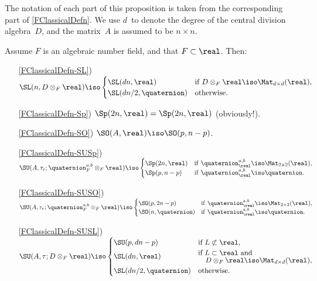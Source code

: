 \begin{prop} \label{GFxR}
 The notation of each part of this
proposition is taken from the corresponding part of
\cref{FClassicalDefn}. We use $d$~to denote the
degree of the central division algebra~$D$, and the matrix~$A$ is assumed to be $n \times n$.

 Assume $F$ is an algebraic number field, and that $F \subset \real$. Then:

 \begin{enumerate} \itemsep=\medskipamount
 
 \item[\ref{FClassicalDefn-SL})]
 $\SL(n,D \otimes_F \real) \iso
 \begin{cases}
 \SL(dn,\real) & \text{if $D  \otimes_F \real \iso \Mat_{d \times d}(\real)$}, \\
 \SL(dn/2,\quaternion) & \text{otherwise} .
 \end{cases}$
 
 \item[\ref{FClassicalDefn-Sp})]
 $\Sp(2n, \real) = \Sp(2n,\real)$ \textup(obviously!\/\textup).

 \item[\ref{FClassicalDefn-SO})]
 $\SO(A,\real) \iso \SO(p,n-p)$.
 
 \item[\ref{FClassicalDefn-SUSp})] \label{GFxR-SUSp}
 $\SU(A,\tau_c; \quaternion^{a,b}_F \otimes_F \real) \iso 
 \begin{cases}
 \Sp(2n,\real) & \text{if\/ $\quaternion^{a,b}_\real \iso \Mat_{2 \times 2}(\real)$}, \\
 \Sp(p,n-p) & \text{if\/ $\quaternion^{a,b}_\real \iso \quaternion$} .
 \end{cases}$
 
 \item[\ref{FClassicalDefn-SUSO})] 
 $\SU(A,\tau_r; \quaternion^{a,b}_F \otimes_F \real) \iso 
 \begin{cases}
 \SO(p,2n-p) & \text{if\/ $\quaternion^{a,b}_\real \iso \Mat_{2 \times 2}(\real)$}, \\
 \SO(n,\quaternion) & \text{if\/ $\quaternion^{a,b}_\real \iso \quaternion$} .
 \end{cases}$
 
 \item[\ref{FClassicalDefn-SUSL})]
 $\SU(A,\tau;D \otimes_F \real) \iso 
 \begin{cases}
 \SU(p, dn-p)&  \text{if $L \not\subset \real$} , \\
 \SL(dn,\real) & 
 \begin{matrix} \text{if $L \subset \real$ and} \hfill
 	\\[-4pt] \quad \text{$D \otimes_F \real \iso \Mat_{d \times d}(\real)$} , 
	\end{matrix}\\
 \SL(dn/2,\quaternion) & \text{otherwise} .
 \end{cases}$
 
 \end{enumerate}
 \end{prop}

